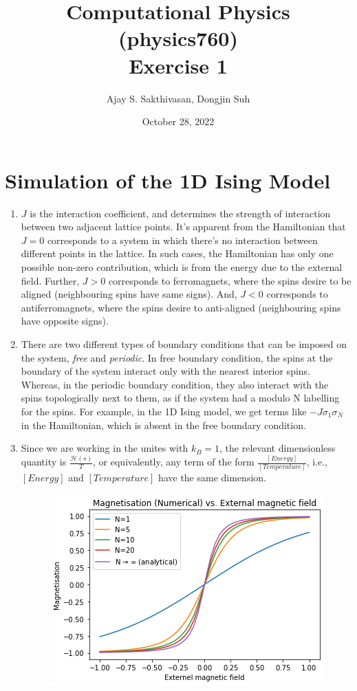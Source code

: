 \documentclass{article}
\title{Computational Physics (physics760) \\ Exercise 1}
\author{Ajay S. Sakthivasan, Dongjin Suh}
\date{October 28, 2022}
\begin{document}
\maketitle

\section{Simulation of the 1D Ising Model}
\begin{enumerate}
    \item $J$ is the interaction coefficient, and determines the strength of interaction between two adjacent lattice points. It's apparent from the Hamiltonian that $J = 0$ corresponds to a system in which there's no interaction between different points in the lattice. In such cases, the Hamiltonian has only one possible non-zero contribution, which is from the energy due to the external field. Further, $J>0$ corresponds to ferromagnets, where the spins desire to be aligned (neighbouring spins have same signs). And, $J<0$ corresponds to antiferromagnets, where the spins desire to anti-aligned (neighbouring spins have opposite signs).
    \item There are two different types of boundary conditions that can be imposed on the system, \textit{free} and \textit{periodic}. In free boundary condition, the spins at the boundary of the system interact only with the nearest interior spins. Whereas, in the periodic boundary condition, they also interact with the spins topologically next to them, as if the system had a modulo N labelling for the spins. For example, in the 1D Ising model, we get terms like $-J\sigma_1\sigma_N$ in the Hamiltonian, which is absent in the free boundary condition.
    \item Since we are working in the unites with $k_B = 1$, the relevant dimensionless quantity is $\frac{\mathcal{H}(s)}{T}$, or equivalently, any term of the form $\frac{[Energy]}{[Temperature]}$, i.e., $[Energy]$ and $[Temperature]$ have the same dimension.\\
\begin{figure}[h!]
    \includegraphics[width=.45\textwidth]{mh-numerical.png}\hfill

\end{figure}
\end{enumerate}
\end{document}

